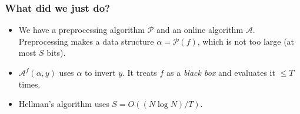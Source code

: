 \documentclass[usenames, dvipsnames, t, table]{beamer}
\newcommand{\A}{\mathcal{A}}
\renewcommand{\P}{\mathcal{P}}
\begin{document}
 \begin{frame}[fragile]
   \frametitle{What did we just do?}
   \begin{itemize}
   \item We have a preprocessing algorithm $\P$ and an online algorithm $\A$. Preprocessing makes a data structure $\alpha = \P(f)$, which is not too large (at most $S$ bits).
     \pause
   \item $\A^f(\alpha, y)$ uses $\alpha$ to invert $y$. It treats $f$ as a \emph{black box} and evaluates it $\leq T$ times.
     \pause
\item Hellman's algorithm uses $S = O((N \log N) / T).$

\end{itemize}
\end{frame}
\end{document}

